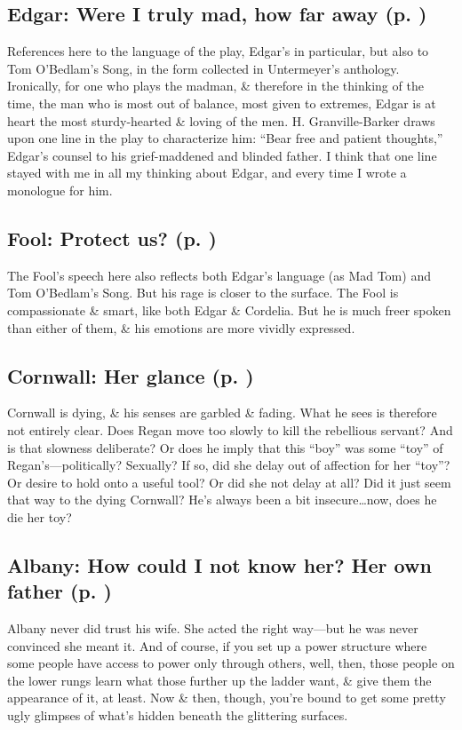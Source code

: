 \subsection*{Edgar: Were I truly mad, how far away (p. \pageref{ch:lear_ap})}
References here to the language of the play, Edgar's in particular, but also to Tom O'Bedlam's Song, in the form collected in Untermeyer's anthology. Ironically, for one who plays the madman, \& therefore in the thinking of the time, the man who is most out of balance, most given to extremes, Edgar is at heart the most sturdy-hearted \& loving of the men. H. Granville-Barker draws upon one line in the play to characterize him: ``Bear free and patient thoughts,'' Edgar's counsel to his grief-maddened and blinded father. I think that one line stayed with me in all my thinking about Edgar, and every time I wrote a monologue for him.

\subsection*{Fool: Protect us? (p. \pageref{ch:lear_aq})}
The Fool's speech here also reflects both Edgar's language (as Mad Tom) and Tom O'Bedlam's Song. But his rage is closer to the surface. The Fool is compassionate \& smart, like both Edgar \& Cordelia. But he is much freer spoken than either of them, \& his emotions are more vividly expressed.

\subsection*{Cornwall: Her glance (p. \pageref{ch:lear_ar})}
Cornwall is dying, \& his senses are garbled \& fading. What he sees is therefore not entirely clear. Does Regan move too slowly to kill the rebellious servant? And is that slowness deliberate? Or does he imply that this ``boy'' was some ``toy'' of Regan's---politically? Sexually? If so, did she delay out of affection for her ``toy''? Or desire to hold onto a useful tool? Or did she not delay at all? Did it just seem that way to the dying Cornwall? He's always been a bit insecure\ldots{}now, does he die her toy?

\subsection*{Albany: How could I not know her? Her own father (p. \pageref{ch:lear_as})}
Albany never did trust his wife. She acted the right way---but he was never convinced she meant it. And of course, if you set up a power structure where some people have access to power only through others, well, then, those people on the lower rungs learn what those further up the ladder want, \& give them the appearance of it, at least. Now \& then, though, you're bound to get some pretty ugly glimpses of what's hidden beneath the glittering surfaces.

